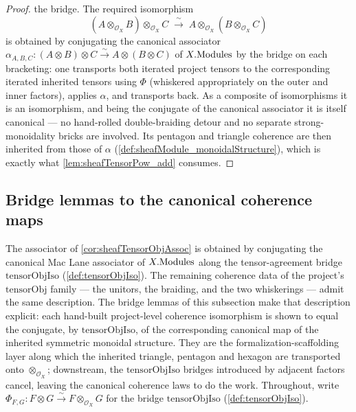 \begin{proof}
  \leanok
  the bridge. The required isomorphism
  \[
    (A \otimes_{\mathcal{O}_X} B) \otimes_{\mathcal{O}_X} C
      \;\xrightarrow{\ \sim\ }\;
      A \otimes_{\mathcal{O}_X} (B \otimes_{\mathcal{O}_X} C)
  \]
  is obtained by conjugating the canonical associator
  \(\alpha_{A,B,C} : (A \otimes B) \otimes C \xrightarrow{\sim}
  A \otimes (B \otimes C)\) of \(X.\mathrm{Modules}\) by the bridge on each bracketing:
  one transports both iterated project tensors to the corresponding iterated
  inherited tensors using \(\Phi\) (whiskered appropriately on the outer and inner
  factors), applies \(\alpha\), and transports back. As a composite of
  isomorphisms it is an isomorphism, and being the conjugate of the canonical
  associator it is itself canonical --- no hand-rolled double-braiding detour and
  no separate strong-monoidality bricks are involved. Its pentagon and triangle
  coherence are then inherited from those of \(\alpha\)
  (\cref{def:sheafModule_monoidalStructure}), which is exactly what
  \cref{lem:sheafTensorPow_add} consumes.
\end{proof}


\subsection{Bridge lemmas to the canonical coherence maps}

The associator of \cref{cor:sheafTensorObjAssoc} is obtained by conjugating the
canonical Mac Lane associator of \(X.\mathrm{Modules}\) along the tensor-agreement bridge
\(\mathrm{tensorObjIso}\) (\cref{def:tensorObjIso}). The remaining coherence data
of the project's \(\mathrm{tensorObj}\) family --- the unitors, the braiding, and
the two whiskerings --- admit the same description. The bridge lemmas of this
subsection make that description explicit: each hand-built project-level
coherence isomorphism is shown to equal the conjugate, by
\(\mathrm{tensorObjIso}\), of the corresponding canonical map of the inherited
symmetric monoidal structure. They are the formalization-scaffolding layer along
which the inherited triangle, pentagon and hexagon are transported onto
\(\otimes_{\mathcal{O}_X}\); downstream, the \(\mathrm{tensorObjIso}\) bridges
introduced by adjacent factors cancel, leaving the canonical coherence laws to do
the work. Throughout, write \(\Phi_{F,G} : F \otimes G \xrightarrow{\sim}
F \otimes_{\mathcal{O}_X} G\) for the bridge \(\mathrm{tensorObjIso}\)
(\cref{def:tensorObjIso}).

